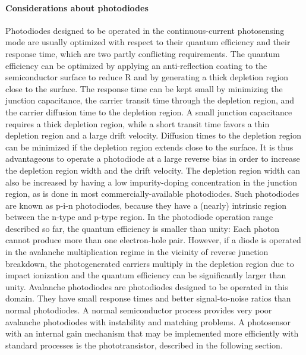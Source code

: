 \paragraph{Considerations about photodiodes} Photodiodes designed to be operated in the continuous-current photosensing mode are usually optimized with respect to their quantum efficiency and their
response time, which are two partly conflicting requirements. The quantum
efficiency can be optimized by applying an anti-reflection coating to the semiconductor surface to reduce R and by generating a thick depletion region close
to the surface. The response time can be kept small by minimizing the junction capacitance, the carrier transit time through the depletion region, and the
carrier diffusion time to the depletion region. A small junction capacitance requires a thick depletion region, while a short transit time favors a thin depletion
region and a large drift velocity. Diffusion times to the depletion region can be
minimized if the depletion region extends close to the surface. It is thus advantageous to operate a photodiode at a large reverse bias in order to increase
the depletion region width and the drift velocity. The depletion region width
can also be increased by having a low impurity-doping concentration in the
junction region, as is done in most commercially-available photodiodes. Such
photodiodes are known as p-i-n photodiodes, because they have a (nearly) intrinsic region between the n-type and p-type region.
In the photodiode operation range described so far, the quantum efficiency
is smaller than unity: Each photon cannot produce more than one electron-hole
pair. However, if a diode is operated in the avalanche multiplication regime in
the vicinity of reverse junction breakdown, the photogenerated carriers multiply in the depletion region due to impact ionization and the quantum efficiency
can be significantly larger than unity. Avalanche photodiodes are photodiodes
designed to be operated in this domain. They have small response times and
better signal-to-noise ratios than normal photodiodes. A normal semiconductor
process provides very poor avalanche photodiodes with instability and matching problems. A photosensor with an internal gain mechanism that may be
implemented more efficiently with standard processes is the phototransistor,
described in the following section.